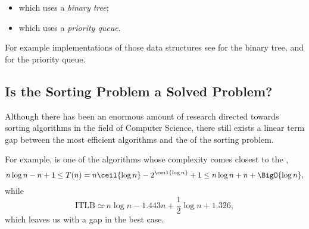 \begin{itemize}
\item \binarytreesort which uses a \emph{binary tree};
\item \tournamentsort which uses a \emph{priority queue}.
\end{itemize}

For example implementations of those data structures see
\citet*{sleator:1985} for the binary tree, and
\citet*{leiserson:2001} for the priority queue.


\subsection*{Is the Sorting Problem a Solved Problem?}

Although there has been an enormous amount of research directed towards sorting
algorithms in the field of Computer Science, there still exists a linear term
gap between the most efficient algorithms and the  of the
sorting problem.

For example, \mergesort is one of the algorithms whose complexity comes closest
to the , \ie
\begin{displaymath}
n \log n - n + 1 \le T(n) = n \ceil{\log n} - 2^{\ceil{\log n}} + 1 \le n \log
n + n + \BigO{\log n},
\end{displaymath}
while
\begin{displaymath}
\text{ITLB} \simeq n \log n - 1.443 n + \frac{1}{2} \log n + 1.326,
\end{displaymath}
which leaves us with a  gap in the best case.
